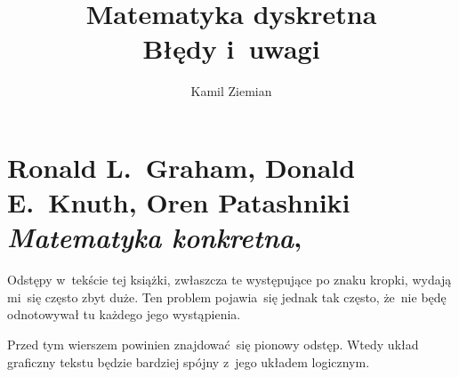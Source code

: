 \documentclass[a4paper,11pt]{article}
\title{Matematyka dyskretna \\
  {\Large Błędy i~uwagi}}
\author{Kamil Ziemian}
\numberwithin{equation}{section}
\begin{document}





\maketitle




















\section{Ronald L.~Graham, Donald E.~Knuth, Oren Patashniki
  \textit{Matematyka konkretna},
  \parencite{Graham-Knuth-Patashnik-Matematyka-Konkretna-Pub-2012}}

\label{sec:Graham-Knuth-Patashnik-Matematyka-konkretna}



\vspace{0em}


\noindent
Odstępy w~tekście tej książki, zwłaszcza te występujące po znaku kropki,
wydają mi~się często zbyt duże. Ten problem pojawia~się jednak tak często,
że~nie będę odnotowywał tu każdego jego wystąpienia.











\vspace{0em}


\noindent
{} Przed tym wierszem powinien znajdować~się pionowy
odstęp. Wtedy układ graficzny tekstu będzie bardziej spójny z~jego układem
logicznym.
\end{document}
